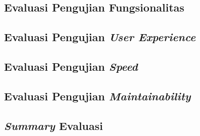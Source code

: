 	\subsection{Evaluasi Pengujian Fungsionalitas}
	
	\subsection{Evaluasi Pengujian \textit{User Experience}}
	
	\subsection{Evaluasi Pengujian \textit{Speed}}
	
	\subsection{Evaluasi Pengujian \textit{Maintainability}}
	
	\subsection{\textit{Summary} Evaluasi}
	
	

	